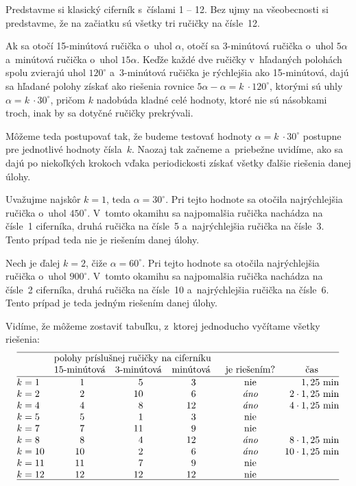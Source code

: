 {%
Predstavme si klasický ciferník s~číslami 1 -- 12. Bez ujmy na všeobecnosti si predstavme,
že na začiatku sú všetky tri ručičky na čísle~12.

Ak sa otočí 15-minútová ručička o~uhol $\alpha$, otočí sa 3-minútová ručička o~uhol
$5\alpha$ a~minútová ručička o~uhol $15\alpha$. Keďže každé dve ručičky v~hľadaných
polohách spolu zvierajú uhol $120^\circ$ a~3-minútová ručička je rýchlejšia ako 15-minútová,
dajú sa hľadané polohy získať ako riešenia rovnice $5\alpha - \alpha = k~\cdot
120^\circ$, ktorými sú uhly $\alpha = k~\cdot 30^\circ$, pričom $k$ nadobúda kladné celé
hodnoty, ktoré nie sú násobkami troch, inak by sa dotyčné ručičky prekrývali.

Môžeme teda postupovať tak, že budeme testovať hodnoty $\alpha = k~\cdot 30^\circ$
postupne pre jednotlivé hodnoty čísla~$k$. Naozaj tak začneme a~priebežne uvidíme,
ako sa dajú po niekoľkých krokoch vďaka periodickosti získať všetky ďalšie riešenia danej úlohy.

Uvažujme najskôr $k = 1$, teda $\alpha = 30^\circ$.
Pri tejto hodnote sa otočila najrýchlejšia ručička o~uhol $450^\circ$. V~tomto
okamihu sa najpomalšia ručička nachádza na čísle~1 ciferníka, druhá ručička na
čísle~5 a~najrýchlejšia ručička na čísle~3. Tento prípad teda nie je riešením danej úlohy.

Nech je ďalej $k = 2$, čiže $\alpha =60^\circ$.
Pri tejto hodnote sa otočila najrýchlejšia ručička o~uhol $900^\circ$.
V~tomto okamihu sa najpomalšia ručička nachádza na čísle~2 ciferníka, druhá
ručička na čísle~10 a~najrýchlejšia ručička na čísle~6. Tento prípad je teda jedným
riešením danej úlohy.


Vidíme, že môžeme zostaviť tabuľku, z~ktorej jednoducho vyčítame všetky riešenia:
$$
\def\@{\phantom0}
\def\toprule{\noalign{\hrule\vskip2pt}}
\def\midrule{\noalign{\vskip2pt\hrule\vskip2pt}}
\def\botrule{\noalign{\vskip2pt\hrule}}
\vbox{\let\\=\cr
\halign{\hss#\unskip\hss&&\quad\hss#\unskip\hss\cr
\toprule
&\multispan3\quad\hss polohy príslušnej ručičky na ciferníku\hss &\\
& 15-minútová & 3-minútová & minútová &\enspace je riešením? & čas \\
\midrule
$k=1\@$ & \@1 & \@5 & \@3 &\enspace nie & $\phantom{12 \cdot {}}1,25$ min\\
$k=2\@$ & \@2 & 10 & \@6 &\enspace {\it áno} & $\@2 \cdot 1,25$ min \\
$k=4\@$ & \@4 & \@8 & 12 &\enspace {\it áno} & $\@4 \cdot 1,25$ min \\
$k=5\@$ & \@5 & \@1 & \@3 &\enspace nie & \\
$k=7\@$ & \@7 & 11 & \@9 &\enspace nie & \\
$k=8\@$ & \@8 & \@4 & 12 &\enspace {\it áno} & $\@8 \cdot 1,25$ min \\
$k=10$ & 10 & \@2 & \@6 &\enspace {\it áno} & $10 \cdot 1,25$ min \\
$k=11$ & 11 & \@7 & \@9 &\enspace nie & \\
$k=12$ & 12 & 12 & 12 &\enspace nie & \\
\botrule
}}
$$

}
